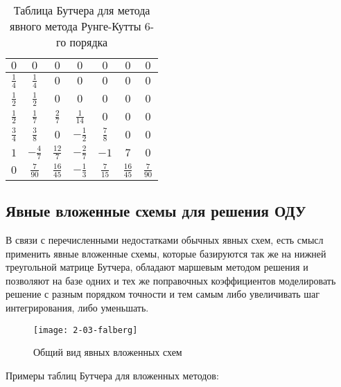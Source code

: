 \begin{table}    
    \caption{Таблица Бутчера для метода явного метода Рунге-Кутты 6-го порядка}
    \begin{tabular}{|c|c|c|c|c|c|c|}
    \hline
    $0$ & $0$ & $0$ & $0$ & $0$ & $0$ & $0$\\
    \hline
    $\frac{1}{4}$ & $\frac{1}{4}$ & $0$ & $0$ & $0$ & $0$ & $0$\\
    \hline
    $\frac{1}{2}$ & $\frac{1}{2}$ & $0$ & $0$ & $0$ & $0$ & $0$\\
    \hline
    $\frac{1}{2}$ & $\frac{1}{7}$ & $\frac{2}{7}$ & $\frac{1}{14}$ & $0$ & $0$ & $0$\\
    \hline
    $\frac{3}{4}$ & $\frac{3}{8}$ & $0$ & $-\frac{1}{2}$ & $\frac{7}{8}$ & $0$ & $0$\\
    \hline
    $1$ & $-\frac{4}{7}$ & $\frac{12}{7}$ & $-\frac{2}{7}$ & $-1$ & $7$ & $0$\\
    \hline
    $0$ & \cellcolor{lightgray} $\frac{7}{90}$ & \cellcolor{lightgray} $\frac{16}{45}$ & \cellcolor{lightgray} $-\frac{1}{3}$ & \cellcolor{lightgray} $\frac{7}{15}$ & \cellcolor{lightgray} $\frac{16}{45}$ & \cellcolor{lightgray} $\frac{7}{90}$\\
    \hline
    \end{tabular}
    \label{tab:RK6}
\end{table}

\subsection{Явные вложенные схемы для решения ОДУ}

В связи с перечисленными недостатками обычных явных схем, есть смысл применить явные вложенные схемы, которые базируются так же на
нижней треугольной матрице Бутчера, обладают маршевым
методом решения и позволяют на базе одних и тех же поправочных коэффициентов моделировать решение с разным порядком точности и тем
самым либо увеличивать шаг интегрирования, либо уменьшать.


\begin{figure}
    \texttt{[image: 2-03-falberg]}
    \caption{Общий вид явных вложенных схем}
    \label{fig:falberg}
\end{figure}

Примеры таблиц Бутчера для вложенных методов:

